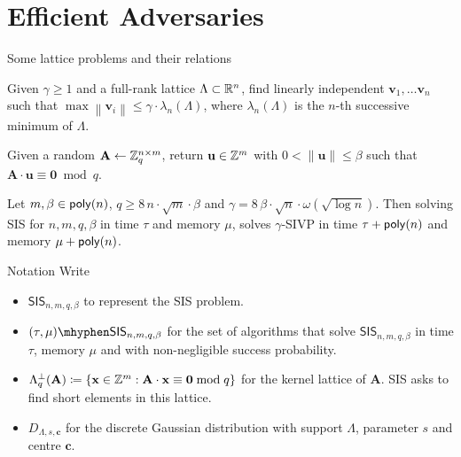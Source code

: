 \documentclass[xcolor=table,10pt,aspectratio=169]{beamer}
\renewcommand{\vec}[1]{\ensuremath{\mathbf{#1}}\xspace}
\newcommand{\norm}[1]{\left\lVert#1\right\rVert}
\providecommand{\mat}[1]{\ensuremath{\vec{#1}}\xspace}
\newcommand{\SIS}{\ensuremath{\mathsf{SIS}}\xspace}
\begin{document}
\section{Efficient Adversaries}
\label{sec:orga0bcb66}

\begin{frame}[label={sec:orgf71b901}]{Some lattice problems and their relations}
\begin{definition}
Given \(\gamma \ge 1\) and a full-rank lattice \(\Lambda \subset \mathbb{R}^{n}\), find linearly independent \(\vec{v}_{1}, \ldots \vec{v}_{n}\) such that \(\max\norm{\vec{v}_i} \leq \gamma \cdot \lambda_{n}(\Lambda)\),  where \(\lambda _{n}(\Lambda)\) is the \(n\)-th successive minimum of ⁠\(\Lambda\).
\label{def:sivp}
\end{definition}

\begin{definition}
Given a random \(\mat{A} \gets \ZZ_{q}^{n \times m}\), return \(\vec{u} \in \ZZ^{m}\) with \(0 < \norm{\vec{u}} \leq \beta\) such that \(\mat{A} \cdot \vec{u} \equiv \vec{0} \bmod q\).
\label{def:sis}
\end{definition}

\begin{theorem}
Let \(m, \beta \in \poly[n]\), \(q \geq 8\,n\cdot\sqrt{m}\cdot\beta\) and \(\gamma = 8\, \beta\cdot\sqrt{n} \cdot \omega(\sqrt{\log n})\). Then solving SIS for \(n,m,q,\beta\) in time \(\tau\) and memory \(\mu\), solves \(\gamma\)-SIVP in time \(\tau + \poly[n]\) and memory \(\mu + \poly[n]\).
\label{thm:sivp-sis}
\end{theorem}
\end{frame}
\begin{frame}[label={sec:org5a7743a}]{Notation}
Write
\begin{itemize}
\item \(\SIS_{n,m,q,\beta}\) to represent the SIS problem.
\item \((\tau, \mu)\mhyphen\SIS_{n,m,q,\beta}\) for the set of algorithms that solve \(\SIS_{n,m,q,\beta}\) in time \(\tau\), memory \(\mu\) and with non-negligible success probability.
\item \(\Lambda_{q}^{\bot}(\mat{A}) \coloneqq \{\vec{x} \in \ZZ^m : \mat{A} \cdot \vec{x} \equiv \vec{0} \bmod q\}\) for the kernel lattice of \(\mat{A}\). SIS asks to find short elements in this lattice.
\item \(D_{\Lambda,s,\vec{c}}\) for the discrete Gaussian distribution with support \(\Lambda\), parameter \(s\) and centre \(\vec{c}\).
\end{itemize}
\end{frame}
\end{document}
